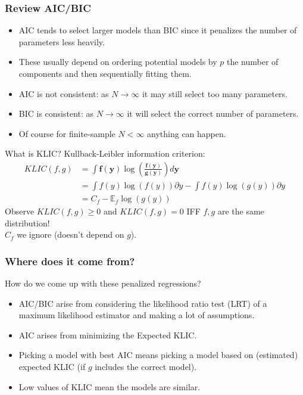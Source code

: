 \documentclass[xcolor=pdftex,dvipsnames,table,mathserif,aspectratio=169]{beamer}
\begin{document}
\begin{frame}
\frametitle{Review AIC/BIC}
\begin{itemize}
\item AIC tends to select larger models than BIC since it penalizes the number of parameters less heavily.
\item These usually depend on ordering potential models by $p$ the number of components and then sequentially fitting them.
\item AIC is not consistent: as $N \rightarrow \infty$ it may still select too many parameters.
\item BIC is consistent: as $N \rightarrow \infty$ it will select the correct number of parameters.
\item Of course for finite-sample $N < \infty$ anything can happen.
\end{itemize}
\end{frame}


\begin{frame}{What is KLIC?}
Kullback-Leibler information criterion:
\begin{align*}
KLIC(f,g) &=\int \mathbf{f}(\mathbf{y}) \log \left(\frac{\mathbf{f}(\mathbf{y})}{\mathbf{g}(\mathbf{y})}\right) d \mathbf{y}\\
&= \int  f(y) \log(f(y)) \partial y - \int  f(y) \log(g(y)) \partial y  \\
&= C_f - \mathbb{E}_f  \log(g(y))
\end{align*}
Observe $KLIC(f,g) \geq 0$ and $KLIC(f,g)=0$ IFF $f,g$ are the same distribution!\\
$C_f$ we ignore (doesn't depend on $g$).
\end{frame}

\begin{frame}
\frametitle{Where does it come from?}
How do we come up with these penalized regressions?
\begin{itemize}
\item AIC/BIC arise from considering the likelihood ratio test (LRT) of a maximum likelihood estimator and making a lot of assumptions.
\item AIC arises from minimizing the Expected KLIC.
\item Picking a model with best AIC means picking a model based on (estimated) expected KLIC (if $g$ includes the correct model).
\item Low values of KLIC mean the models are similar.
\end{itemize}
\end{frame}
\end{document}
